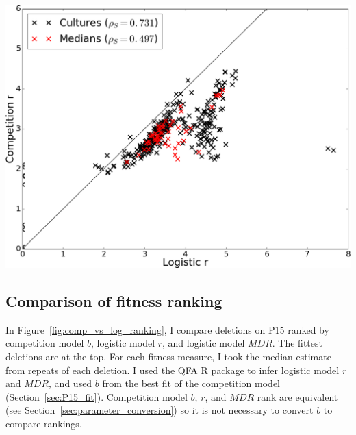 \graphicspath{{images/p15_correlations/}}
\begin{Figure}
  \centering
  \includegraphics[width=\linewidth]{final/r_correlations_median_spearmans_trimmed_2}
  \label{fig:P15_correlations}
\end{Figure}

\subsection{Comparison of fitness ranking}


In Figure~\ref{fig:comp_vs_log_ranking}, I compare deletions on P15
ranked by competition model \(b\), logistic model \(r\), and logistic
model \(MDR\). The fittest deletions are at the top. For each fitness
measure, I took the median estimate from repeats of each deletion. I
used the QFA R package to infer logistic model \(r\) and \(MDR\), and
used \(b\) from the best fit of the competition model
(Section~\ref{sec:P15_fit}). Competition model \(b\), \(r\), and
\(MDR\) rank are equivalent (see
Section~\ref{sec:parameter_conversion}) so it is not necessary to
convert \(b\) to compare rankings.

